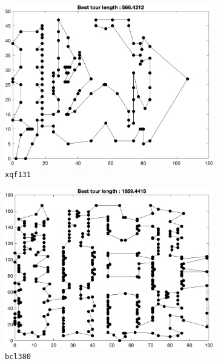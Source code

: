 \begin{figure}[H]
	\centering
%
	\begin{subfigure}[b]{0.45\textwidth}
		\centering
		\includegraphics[width=\textwidth]{benchmarks/final/xqf131.png}
		\caption{\texttt{xqf131}}
    	\end{subfigure}
	\begin{subfigure}[b]{0.45\textwidth}
		\centering
		\includegraphics[width=\textwidth]{benchmarks/final/bcl380.png}
		\caption{\texttt{bcl380}}
    	\end{subfigure}
	\begin{subfigure}[b]{0.45\textwidth}
		\centering

\end{subfigure}
\end{figure}
